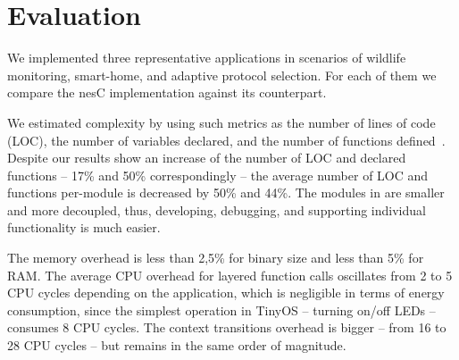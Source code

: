 \section{Evaluation}\label{sec:eval}

We implemented three representative applications in scenarios of wildlife
monitoring, smart-home, and adaptive protocol selection. For each of them we
compare the nesC implementation against its \conesc counterpart.

We estimated complexity by using such metrics as the number of lines of code
(LOC), the number of variables declared, and the number of functions
defined~\cite{Pressman01}. Despite our results show an increase of the number of
LOC and declared functions -- 17\% and 50\% correspondingly -- the average
number of LOC and functions per-module is decreased by 50\% and 44\%. The
modules in \conesc are smaller and more decoupled, thus, developing, debugging,
and supporting individual functionality is much easier.

The memory overhead is less than 2,5\% for binary size and less than 5\% for
RAM. The average CPU overhead for layered function calls oscillates from 2 to 5
CPU cycles depending on the application, which is negligible in terms of energy
consumption, since the simplest operation in TinyOS -- turning on/off LEDs --
consumes 8 CPU cycles. The context transitions overhead is bigger -- from 16 to
28 CPU cycles -- but remains in the same order of magnitude.
